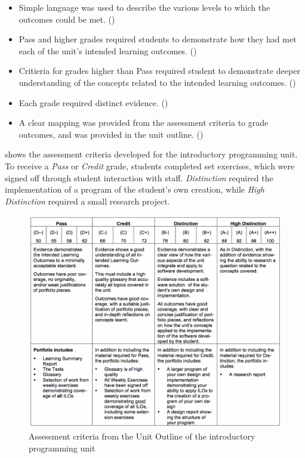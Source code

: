 \begin{itemize}[noitemsep,nolistsep]
	\item Simple language was used to describe the various levels to which the outcomes could be met. ()
	\item Pass and higher grades required students to demonstrate how they had met each of the unit's intended learning outcomes. ()
	\item Critieria for grades higher than Pass required student to demonstrate deeper understanding of the concepts related to the intended learning outcomes. ()
	\item Each grade required distinct evidence. ()
	\item A clear mapping was provided from the assessment criteria to grade outcomes, and was provided in the unit outline. ()
\end{itemize}


 shows the assessment criteria developed for the introductory programming unit. To receive a \emph{Pass} or \emph{Credit} grade, students completed set exercises, which were signed off through student interaction with staff. \emph{Distinction} required the implementation of a program of the student's own creation, while \emph{High Distinction} required a small research project.

\begin{figure}[p]
	\centering
	\includegraphics[width=\textwidth]{AssessmentCriteria}
	\caption{Assessment criteria from the Unit Outline of the introductory programming unit}
	\label{fig:assessment_criteria}
\end{figure}


